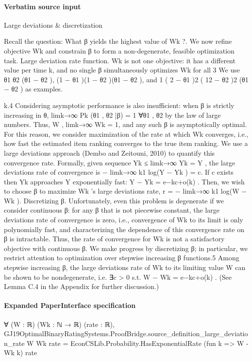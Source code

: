 \documentclass[10pt]{article}
\begin{document}
\paragraph{Verbatim source input}
\begin{ReviewVerbatim}
Large deviations & discretization

Recall the question: What β yields the highest value
of Wk ?. We now refine objective Wk and constrain β
to form a non-degenerate, feasible optimization task.
Large deviation rate function. Wk is not one
objective: it has a different value per time k, and
no single β simultaneously optimizes Wk for all
3
We use θ1 θ2 (θ1 − θ2 ), (1 − θ1 )(1 − θ2 )(θ1 − θ2 ), and
1
( 2 − θ1 )2 ( 12 − θ2 )2 (θ1 − θ2 ) as examples.

k.4 Considering asymptotic performance is also
insufficient: when β is strictly increasing in θ,
limk→∞ Pk (θ1 , θ2 |β) = 1 ∀θ1 , θ2 by the law of large
numbers. Thus, W , limk→∞ Wk = 1, and any such
β is asymptotically optimal.
For this reason, we consider maximization of the
rate at which Wk converges, i.e., how fast the estimated item ranking converges to the true item ranking. We use a large deviations approach (Dembo
and Zeitouni, 2010) to quantify this convergence
rate. Formally, given sequence Yk ≤ limk→∞ Yk =
Y , the large deviations rate of convergence is
− limk→∞ k1 log(Y − Yk ) = c. If c exists then Yk approaches Y exponentially fast: Y − Yk = e−kc+o(k) .
Then, we wish to choose β to maximize Wk ’s large
deviations rate, r = − limk→∞ k1 log(W − Wk ).
Discretizing β. Unfortunately, even this problem
is degenerate if we consider continuous β: for any β
that is not piecewise constant, the large deviations
rate of convergence is zero, i.e., convergence of Wk
to its limit is only polynomially fast, and characterizing the dependence of this convergence rate on β
is intractable. Thus, the rate of convergence for Wk
is not a satisfactory objective with continuous β.
We make progress by discretizing β; in particular,
we restrict attention to optimization over stepwise
increasing β functions.5 Among stepwise increasing
β, the large deviations rate of Wk to its limiting
value W can be shown to be nondegenerate, i.e. ∃c >
0 s.t. W − Wk = e−kc+o(k) . (See Lemma C.4 in the
Appendix for further discussion.)
\end{ReviewVerbatim}


\paragraph{Expanded PaperInterface specification}
\begin{ReviewVerbatim}
∀ (W : ℝ) (Wk : ℕ → ℝ) (rate : ℝ),
  GJ19OptimalBinaryRatingSystems.ProofBridge.source_definition_large_deviation_rate W Wk rate =
    EconCSLib.Probability.HasExponentialRate (fun k => W - Wk k) rate
\end{ReviewVerbatim}
\end{document}
